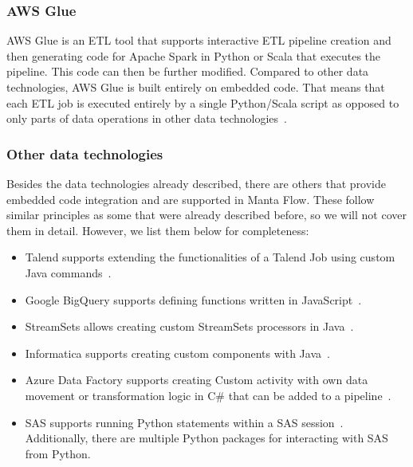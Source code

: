 \subsubsection{AWS Glue}
AWS Glue is an ETL tool that supports interactive ETL pipeline creation and then generating code for Apache Spark in Python or Scala that executes the pipeline. This code can then be further modified. Compared to other data technologies, AWS Glue is built entirely on embedded code. That means that each ETL job is executed entirely by a single Python/Scala script as opposed to only parts of data operations in other data technologies~\cite{awsglueintro}. 

\subsubsection{Other data technologies}
Besides the data technologies already described, there are others that provide embedded code integration and are supported in Manta Flow. These follow similar principles as some that were already described before, so we will not cover them in detail. However, we list them below for completeness:
\begin{itemize}
    \item Talend supports extending the functionalities of a Talend Job using custom Java commands~\cite{talend}.
    \item Google BigQuery supports defining functions written in JavaScript~\cite{bigquery}.
    \item StreamSets allows creating custom StreamSets processors in Java~\cite{streamsets}.
    \item Informatica supports creating custom components with Java~\cite{informatica}.
    \item Azure Data Factory supports creating Custom activity with own data movement or transformation logic in C\# that can be added to a pipeline~\cite{adf}.
    \item SAS supports running Python statements within a SAS session~\cite{sas}. Additionally, there are multiple Python packages for interacting with SAS from Python.
\end{itemize}

